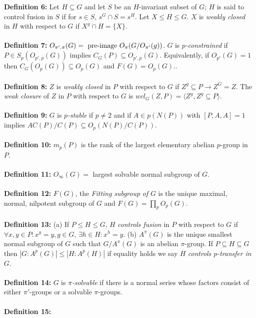 {\bf Definition 6:} Let $H \subseteq G$ and let $S$ be an $H$-invariant subset of $G$;
$H$ is said to
control fusion in $S$ if for $s \in S$, $s^G \cap S = s^H$.
Let $X \le H \le G$.  $X$ is \emph{weakly closed} in $H$ with respect to $G$ if
$X^g \cap H = \{X\}$.\\
\\
{\bf Definition 7:} $O_{\pi', \pi}(G) = \textnormal{ pre-image } O_{\pi}(G/O_{\pi'}(g))$.
$G$ is $p$\emph{-constrained} if
$P \in S_p ( O_{p',p} (G))$ implies $C_G(P) \subseteq O_{p',p} (G)$.
Equivalently, if $O_{p'}(G)=1$ then $C_G(O_p(G)) \subseteq O_p(G)$ and $F(G)= O_p(G)$..
\\
\\
{\bf Definition 8:}
$Z$ is \emph {weakly closed} in $P$ with respect to $G$ if $Z^g \subseteq P \rightarrow Z^G=Z$.
The \emph {weak closure} of $Z$ in $P$ with respect to $G$ is $wcl_G(Z, P)=
\langle Z^g, Z^g \subseteq P \rangle $.
\\
\\
{\bf Definition 9:}
$G$ is $p$\emph{-stable} if $p \ne 2$ and
if $A \in p(N(P))$ with $[P,A,A]= 1$ implies $A C(P)/C(P) \subseteq O_p (N(P)/C(P))$.
\\
\\
{\bf Definition 10:}
$m_p(P)$ is the rank of the largest elementary abelian $p$-group in $P$.
\\
\\
{\bf Definition 11:}
$O_{\infty}(G)=$ largest solvable normal subgroup of $G$.
\\
\\
{\bf Definition 12:} $F(G)$, the \emph{Fitting subgroup of $G$}
is the unique maximal, normal, nilpotent subgroup of $G$ and
$F(G)= \prod_p O_p(G)$.
\\
\\
{\bf Definition 13:} (a) If $P \leq H \leq G$, $H$ \emph{controls fusion} in $P$ with respect to
$G$ if $\forall x, y \in P: x^g=y, g \in G$, $\exists h \in H: x^h=y$.
(b) $A^{\pi}(G)$ is the unique smallest normal subgroup of $G$ such that
$G/A^{\pi}(G)$ is an abelian $\pi$-group.  If $P \subseteq H \subseteq G$ then
$ |G:A^p(G)| \le |H:A^p(H)|$ if equality holds we say $H$ \emph {controls $p$-transfer in $G$}.
\\
\\
{\bf Definition 14:}
$G$  is
$\pi$\emph{-solvable} if there is a normal series whose factors
consist of either $\pi'$-groups or a solvable
$\pi$-groups.
\\
\\
{\bf Definition 15:} 
